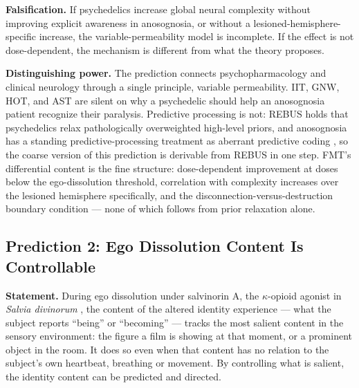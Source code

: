 \documentclass[12pt]{article}
\begin{document}
\textbf{Falsification.} If psychedelics increase global neural complexity without improving explicit awareness in anosognosia, or without a lesioned-hemisphere-specific increase, the variable-permeability model is incomplete. If the effect is not dose-dependent, the mechanism is different from what the theory proposes.

\textbf{Distinguishing power.} The prediction connects psychopharmacology and clinical neurology through a single principle, variable permeability. IIT, GNW, HOT, and AST are silent on why a psychedelic should help an anosognosia patient recognize their paralysis. Predictive processing is not: REBUS holds that psychedelics relax pathologically overweighted high-level priors, and anosognosia has a standing predictive-processing treatment as aberrant predictive coding \citep{Fotopoulou2014}, so the coarse version of this prediction is derivable from REBUS in one step. FMT's differential content is the fine structure: dose-dependent improvement at doses below the ego-dissolution threshold, correlation with complexity increases over the lesioned hemisphere specifically, and the disconnection-versus-destruction boundary condition — none of which follows from prior relaxation alone.


\subsection{Prediction 2: Ego Dissolution Content Is Controllable}


\textbf{Statement.} During ego dissolution under salvinorin A, the $\kappa$-opioid agonist in \emph{Salvia divinorum} \citep{Roth2002}, the content of the altered identity experience --- what the subject reports ``being'' or ``becoming'' --- tracks the most salient content in the sensory environment: the figure a film is showing at that moment, or a prominent object in the room. It does so even when that content has no relation to the subject's own heartbeat, breathing or movement. By controlling what is salient, the identity content can be predicted and directed.
\end{document}
